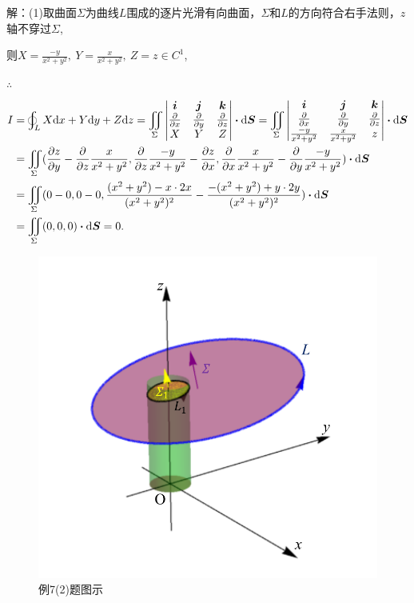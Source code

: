 \documentclass[12pt,UTF8,fleqn]{ctexart}
\newcommand{\BLOInt}[2]{\varoint\nolimits_{#1}#2}
\newcommand{\md}[1]{\mathrm d#1}
\newcommand{\BSIInt}[2]{\iint\limits_{#1}#2}
\begin{document}
\begin{enumerate}
解：(1)取曲面$\Sigma$为曲线$L$围成的逐片光滑有向曲面，$\Sigma$和$L$的方向符合右手法则，$z$轴不穿过$\Sigma$,

则$X=\frac{-y}{x^2+y^2},\ Y=\frac x{x^2+y^2},\ Z=z\in C^1$,

$\therefore$
\[\begin{aligned}
I&=\BLOInt L{X\md x+Y\md y+Z\md z}=\BSIInt\Sigma{\begin{vmatrix}
\bm i&\bm j&\bm k\\
\frac\partial{\partial x}&\frac\partial{\partial y}&\frac\partial{\partial z}\\
X&Y&Z
\end{vmatrix}}\bm\cdot\md\bm S=\BSIInt\Sigma{\begin{vmatrix}
\bm i&\bm j&\bm k\\
\frac\partial{\partial x}&\frac\partial{\partial y}&\frac\partial{\partial z}\\
\frac{-y}{x^2+y^2}&\frac x{x^2+y^2}&z
\end{vmatrix}}\bm\cdot\md\bm S\\
&=\BSIInt\Sigma{(\frac{\partial z}{\partial y}-\frac\partial{\partial z}\frac x{x^2+y^2},\frac\partial{\partial z}\frac{-y}{x^2+y^2}-\frac{\partial z}{\partial x},\frac\partial{\partial x}\frac x{x^2+y^2}-\frac\partial{\partial y}\frac{-y}{x^2+y^2})\bm\cdot\md\bm S}\\
&=\BSIInt\Sigma{(0-0,0-0,\frac{(x^2+y^2)-x\cdot2x}{(x^2+y^2)^2}-\frac{-(x^2+y^2)+y\cdot2y}{(x^2+y^2)^2})\bm\cdot\md\bm S}\\
&=\BSIInt\Sigma{(0,0,0)\bm\cdot\md\bm S}=0.
\end{aligned}\]

\begin{figure}[H]
\begin{center}
\includegraphics[height=0.7\textheight]{Figures24/Fig13-5-3-2.pdf}
\end{center}
\caption{例7(2)题图示}
\label{13-5-3-2}
\end{figure}


\end{enumerate}
\end{document}
